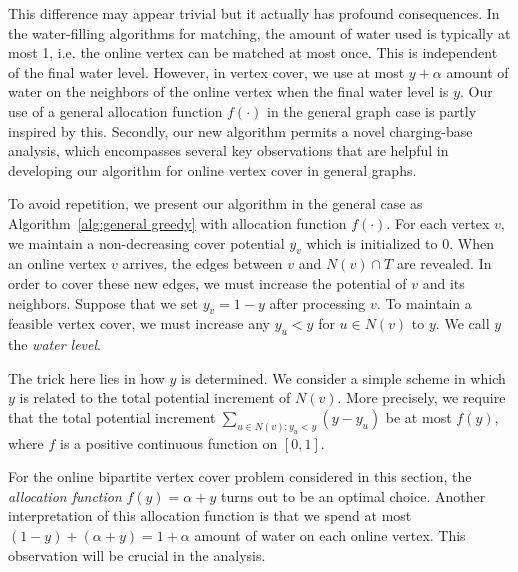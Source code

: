 \documentclass{article}
\begin{document}
This difference may appear trivial but it actually has profound consequences. In the water-filling algorithms for matching, the amount of water used is typically at most 1, i.e. the online vertex can be matched at most once. This is independent of the final water level. However, in vertex cover, we use at most $y+\alpha$ amount of water on the neighbors of the online vertex when the final water level is $y$. Our use of a general allocation function $f(\cdot)$ in the general graph case is partly inspired by this. Secondly, our new algorithm permits a novel charging-base analysis, 
%
%
which encompasses several key observations that are helpful in developing our algorithm for online vertex cover in general graphs.

To avoid repetition, we present our algorithm in the general case as Algorithm~\ref{alg:general greedy} with allocation function $f(\cdot)$. For each vertex $v$, we maintain a non-decreasing cover potential $y_v$ which is initialized to $0$.
When an online vertex $v$ arrives, the edges between $v$ and $N(v)\cap T$ are revealed. In order to cover these new edges, we must increase the potential of $v$ and its neighbors. Suppose that we set $y_v=1-y$ after processing $v$. To maintain a feasible vertex cover, we must increase any $y_u<y$ for $u\in N(v)$ to $y$. We call $y$ the {\em water level}.

The trick here lies in how $y$ is determined. We consider a simple scheme in which $y$ is related to the total potential increment of $N(v)$. More precisely, we require that the total potential increment $\sum_{u\in N(v):y_u<y}(y-y_u)$ be at most $f(y)$, where $f$ is a positive continuous function on $[0,1]$. 

For the online bipartite vertex cover problem considered in this section, the {\em allocation function} $f(y)=\alpha + y$ turns out to be an optimal choice. Another interpretation of this allocation function is that we spend at most $(1-y)+(\alpha + y)=1+\alpha$ amount of water on each online vertex. This observation will be crucial in the analysis. 

\end{document}
